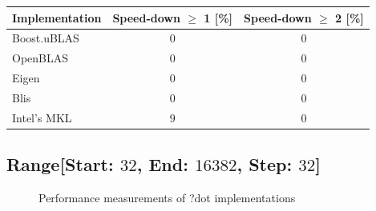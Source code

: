 \begin{table}[ht]
    \begin{tabular}{|l|c|c|}
        \hline
        \textbf{Implementation} & \textbf{Speed-down $\geq$ 1 [\%]} & \textbf{Speed-down $\geq$ 2 [\%]}\\
        \hline
        Boost.uBLAS & $0$ & $0$ \\
        \hline
        OpenBLAS    & $0$ & $0$ \\
        \hline
        Eigen       & $0$ & $0$ \\
        \hline
        Blis        & $0$ & $0$ \\
        \hline
        Intel's MKL & $9$ & $0$ \\
        \hline
    \end{tabular}
\end{table}


\clearpage

\subsection{Range[Start: $32$, End: $16382$, Step: $32$]}
\begin{figure}[htb]
    \centering
    \caption*{Performance measurements of ?dot implementations}
    \label{fig:dot_Sgflop16382}
    \qquad
    \label{fig:dot_Dgflop16382}
\end{figure}



